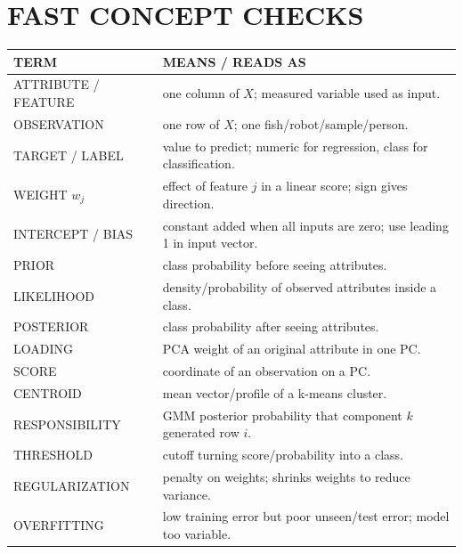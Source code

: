\section*{FAST CONCEPT CHECKS}
\begin{tabularx}{\linewidth}{@{}lX@{}}
\toprule
TERM & MEANS / READS AS\\ \midrule
ATTRIBUTE / FEATURE & one column of $X$; measured variable used as input.\\
OBSERVATION & one row of $X$; one fish/robot/sample/person.\\
TARGET / LABEL & value to predict; numeric for regression, class for classification.\\
WEIGHT $w_j$ & effect of feature $j$ in a linear score; sign gives direction.\\
INTERCEPT / BIAS & constant added when all inputs are zero; use leading 1 in input vector.\\
PRIOR & class probability before seeing attributes.\\
LIKELIHOOD & density/probability of observed attributes inside a class.\\
POSTERIOR & class probability after seeing attributes.\\
LOADING & PCA weight of an original attribute in one PC.\\
SCORE & coordinate of an observation on a PC.\\
CENTROID & mean vector/profile of a k-means cluster.\\
RESPONSIBILITY & GMM posterior probability that component $k$ generated row $i$.\\
THRESHOLD & cutoff turning score/probability into a class.\\
REGULARIZATION & penalty on weights; shrinks weights to reduce variance.\\
OVERFITTING & low training error but poor unseen/test error; model too variable.\\
\bottomrule
\end{tabularx}

